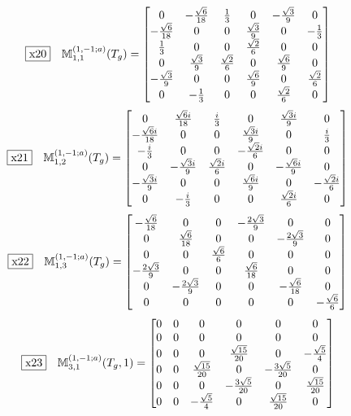 \documentclass[fleqn,10pt,landscape]{jsarticle}
\begin{document}
\begin{dmath*}
\fbox{x20}\quad \mathbb{M}_{1,1}^{(1,-1;a)}(T_{g})=\begin{bmatrix} 0 & - \frac{\sqrt{6}}{18} & \frac{1}{3} & 0 & - \frac{\sqrt{3}}{9} & 0 \\ - \frac{\sqrt{6}}{18} & 0 & 0 & \frac{\sqrt{3}}{9} & 0 & - \frac{1}{3} \\ \frac{1}{3} & 0 & 0 & \frac{\sqrt{2}}{6} & 0 & 0 \\ 0 & \frac{\sqrt{3}}{9} & \frac{\sqrt{2}}{6} & 0 & \frac{\sqrt{6}}{9} & 0 \\ - \frac{\sqrt{3}}{9} & 0 & 0 & \frac{\sqrt{6}}{9} & 0 & \frac{\sqrt{2}}{6} \\ 0 & - \frac{1}{3} & 0 & 0 & \frac{\sqrt{2}}{6} & 0 \end{bmatrix}
\end{dmath*}
\begin{dmath*}
\fbox{x21}\quad \mathbb{M}_{1,2}^{(1,-1;a)}(T_{g})=\begin{bmatrix} 0 & \frac{\sqrt{6} i}{18} & \frac{i}{3} & 0 & \frac{\sqrt{3} i}{9} & 0 \\ - \frac{\sqrt{6} i}{18} & 0 & 0 & \frac{\sqrt{3} i}{9} & 0 & \frac{i}{3} \\ - \frac{i}{3} & 0 & 0 & - \frac{\sqrt{2} i}{6} & 0 & 0 \\ 0 & - \frac{\sqrt{3} i}{9} & \frac{\sqrt{2} i}{6} & 0 & - \frac{\sqrt{6} i}{9} & 0 \\ - \frac{\sqrt{3} i}{9} & 0 & 0 & \frac{\sqrt{6} i}{9} & 0 & - \frac{\sqrt{2} i}{6} \\ 0 & - \frac{i}{3} & 0 & 0 & \frac{\sqrt{2} i}{6} & 0 \end{bmatrix}
\end{dmath*}
\begin{dmath*}
\fbox{x22}\quad \mathbb{M}_{1,3}^{(1,-1;a)}(T_{g})=\begin{bmatrix} - \frac{\sqrt{6}}{18} & 0 & 0 & - \frac{2 \sqrt{3}}{9} & 0 & 0 \\ 0 & \frac{\sqrt{6}}{18} & 0 & 0 & - \frac{2 \sqrt{3}}{9} & 0 \\ 0 & 0 & \frac{\sqrt{6}}{6} & 0 & 0 & 0 \\ - \frac{2 \sqrt{3}}{9} & 0 & 0 & \frac{\sqrt{6}}{18} & 0 & 0 \\ 0 & - \frac{2 \sqrt{3}}{9} & 0 & 0 & - \frac{\sqrt{6}}{18} & 0 \\ 0 & 0 & 0 & 0 & 0 & - \frac{\sqrt{6}}{6} \end{bmatrix}
\end{dmath*}
\begin{dmath*}
\fbox{x23}\quad \mathbb{M}_{3,1}^{(1,-1;a)}(T_{g},1)=\begin{bmatrix} 0 & 0 & 0 & 0 & 0 & 0 \\ 0 & 0 & 0 & 0 & 0 & 0 \\ 0 & 0 & 0 & \frac{\sqrt{15}}{20} & 0 & - \frac{\sqrt{5}}{4} \\ 0 & 0 & \frac{\sqrt{15}}{20} & 0 & - \frac{3 \sqrt{5}}{20} & 0 \\ 0 & 0 & 0 & - \frac{3 \sqrt{5}}{20} & 0 & \frac{\sqrt{15}}{20} \\ 0 & 0 & - \frac{\sqrt{5}}{4} & 0 & \frac{\sqrt{15}}{20} & 0 \end{bmatrix}
\end{dmath*}
\end{document}
